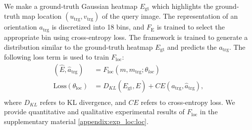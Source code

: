 \documentclass[10pt,twocolumn,letterpaper]{article}
\begin{document}
%
We make a ground-truth Gaussian heatmap $E_\mathrm{gt}$ which highlights the ground-truth map location $(u_\mathrm{trg}, v_\mathrm{trg})$ of the query image. 
%
The representation of an orientation $a_\mathrm{trg}$ is discretized into 18 bins, and $F_\mathrm{E}$ is trained to select the appropriate bin using cross-entropy loss.
%
The framework is trained to generate a distribution similar to the ground-truth heatmap $E_\mathrm{gt}$ and predicts the $a_\mathrm{trg}$.
%
The following loss term is used to train $F_\mathrm{loc}$:
\begin{equation}\label{eq:loc}
\begin{split}
    (\hat{E}, \hat{a}_\mathrm{trg}) &= F_\mathrm{loc}(m, m_\mathrm{trg} ; \theta_{loc}) \\
    \mathrm{Loss}(\theta_\mathrm{loc}) &= D_{KL}(E_\mathrm{gt},\hat{E}) + CE(a_\mathrm{trg},\hat{a}_\mathrm{trg}),  \\
\end{split}
\end{equation}
where $D_{KL}$ refers to KL divergence, and $CE$ refers to cross-entropy loss. 
%
We provide quantitative and qualitative experimental results of $F_\mathrm{loc}$ in the supplementary material \ref{appendix:exp_loc:loc}. 

\end{document}
